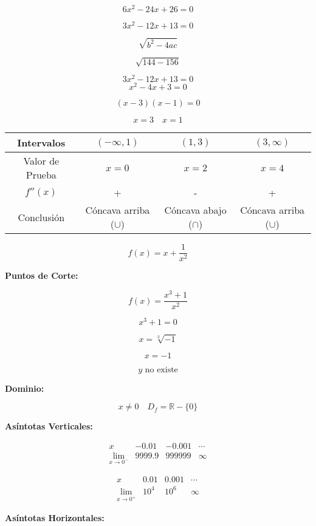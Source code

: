 \[
6x^2 - 24x + 26 = 0
\]

\[
3x^2 - 12x + 13 = 0
\]

\[
\sqrt{b^2 - 4ac}
\]

\[
\sqrt{144 - 156}
\]

\[
3x^2 - 12x + 13 = 0
\]
\[
x^2 - 4x + 3 = 0
\]

\[
(x - 3)(x - 1) = 0
\]


\[
x = 3 \quad x = 1
\]

\begin{center}
    \begin{tabular}{|c|c|c|c|}
        \hline
        Intervalos & $(-\infty,1)$ & $(1,3)$ & $(3,\infty)$ \\
        \hline
        Valor de Prueba & $x=0$ & $x=2$ & $x=4$ \\
        \hline
        $f''(x)$ & + & - & + \\
        \hline
        Conclusión & Cóncava arriba ($\cup$) & Cóncava abajo ($\cap$) & Cóncava arriba ($\cup$) \\
        \hline
    \end{tabular}
\end{center}

\[
f(x) = x + \frac{1}{x^2}
\]

\textbf{Puntos de Corte:}

\[
f(x) = \frac{x^3 + 1}{x^2}
\]

\[
x^3 + 1 = 0
\]

\[
x = \sqrt[3]{-1}
\]

\[
x = -1
\]

\[
y \text{ no existe}
\]

\textbf{Dominio:}

\[
x \neq 0 \quad D_f = \mathbb{R} - \{0\}
\]

\textbf{Asíntotas Verticales:}

\[
\begin{array}{c|c|c|c}
x & -0.01 & -0.001 & \cdots \\
\hline
\lim_{x \to 0^-} & 9999.9 & 999999 & \infty
\end{array}
\]

\[
\begin{array}{c|c|c|c}
x & 0.01 & 0.001 & \cdots \\
\hline
\lim_{x \to 0^+} & 10^4 & 10^6 & \infty
\end{array}
\]


\textbf{Asíntotas Horizontales:}


